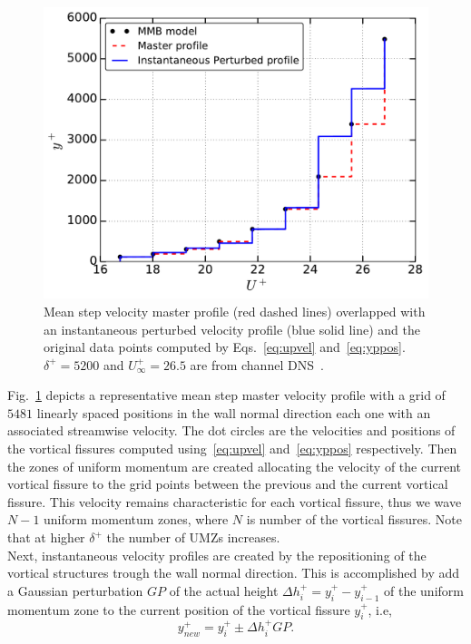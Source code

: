 \documentclass[aps,reprint,amsmath,amssymb,pra]{revtex4-1}%
\begin{document}
\begin{figure}[b]
\includegraphics[scale=0.46]{figures/Master_step_profile}
\caption{\label{fig:master_profile} Mean step velocity master profile (red dashed lines) overlapped with an instantaneous perturbed velocity profile (blue solid line) and the original data points computed by Eqs.~\eqref{eq:upvel} and~\eqref{eq:yppos}. $\delta^+=5200$ and $U^+_{\infty}=26.5$ are from channel DNS~\citep{leemoser2015}.}
\end{figure} 
Fig.~\ref{fig:master_profile} depicts a representative mean step master velocity profile with a grid of $5481$ linearly spaced positions in the wall normal direction each one with an associated streamwise velocity. The dot circles are the velocities and positions of the vortical fissures computed using~\eqref{eq:upvel} and~\eqref{eq:yppos} respectively. Then the zones of uniform momentum are created allocating the velocity of the current vortical fissure to the grid points between the previous and the current vortical fissure. This velocity remains characteristic for each vortical fissure, thus we wave $N-1$ uniform momentum zones, where $N$ is number of the vortical fissures. Note that at higher $\delta^+$ the number of UMZs increases.\\
Next, instantaneous velocity profiles are created by the repositioning of the vortical structures trough the wall normal direction. This is accomplished by add a Gaussian perturbation $GP$ of the actual height $\Delta h^+_i=y^+_i-y^+_{i-1}$ of the uniform momentum zone to the current position of the vortical fissure $y^+_i$, i.e, 
\begin{equation}\label{eq:ypert}
y^+_{new}=y^+_i\pm \Delta h^+_i GP.
\end{equation}
\end{document}
